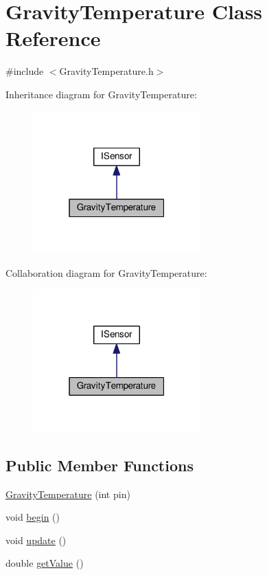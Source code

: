 \hypertarget{class_gravity_temperature}{}\section{Gravity\+Temperature Class Reference}
\label{class_gravity_temperature}


{\ttfamily \#include $<$Gravity\+Temperature.\+h$>$}



Inheritance diagram for Gravity\+Temperature\+:\nopagebreak
\begin{figure}[H]
\begin{center}
\leavevmode
\includegraphics[width=183pt]{class_gravity_temperature__inherit__graph}
\end{center}
\end{figure}


Collaboration diagram for Gravity\+Temperature\+:\nopagebreak
\begin{figure}[H]
\begin{center}
\leavevmode
\includegraphics[width=183pt]{class_gravity_temperature__coll__graph}
\end{center}
\end{figure}
\subsection*{Public Member Functions}
\begin{DoxyCompactItemize}
\item 
\hyperlink{class_gravity_temperature_a1156c03146096ebd11dfeb12d047b017}{Gravity\+Temperature} (int pin)
\item 
void \hyperlink{class_gravity_temperature_a4b0e6bba015c69a153a85cc8221dee2f}{begin} ()
\item 
void \hyperlink{class_gravity_temperature_aa7a3463559fe46fa4471f779fb5ffdce}{update} ()
\item 
double \hyperlink{class_gravity_temperature_a7ee39e7ab5521f9dcbdea543c26c3a26}{get\+Value} ()
\end{DoxyCompactItemize}
